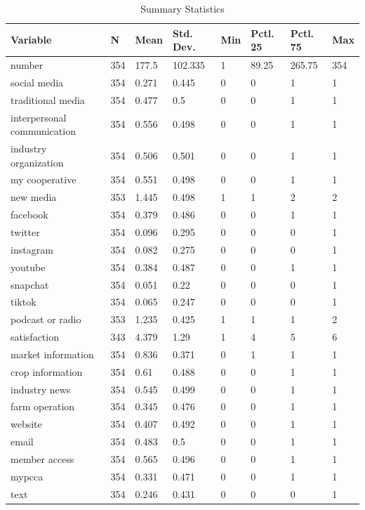 \documentclass[
]{article}
\begin{document}
\begin{table}

\caption{\label{tab:unnamed-chunk-8}Summary Statistics}
\centering
\begin{tabular}[t]{llllllll}
\toprule
Variable & N & Mean & Std. Dev. & Min & Pctl. 25 & Pctl. 75 & Max\\
\midrule
number & 354 & 177.5 & 102.335 & 1 & 89.25 & 265.75 & 354\\
social media & 354 & 0.271 & 0.445 & 0 & 0 & 1 & 1\\
traditional media & 354 & 0.477 & 0.5 & 0 & 0 & 1 & 1\\
interpersonal communication & 354 & 0.556 & 0.498 & 0 & 0 & 1 & 1\\
industry organization & 354 & 0.506 & 0.501 & 0 & 0 & 1 & 1\\
\addlinespace
my cooperative & 354 & 0.551 & 0.498 & 0 & 0 & 1 & 1\\
new media & 353 & 1.445 & 0.498 & 1 & 1 & 2 & 2\\
facebook & 354 & 0.379 & 0.486 & 0 & 0 & 1 & 1\\
twitter & 354 & 0.096 & 0.295 & 0 & 0 & 0 & 1\\
instagram & 354 & 0.082 & 0.275 & 0 & 0 & 0 & 1\\
\addlinespace
youtube & 354 & 0.384 & 0.487 & 0 & 0 & 1 & 1\\
snapchat & 354 & 0.051 & 0.22 & 0 & 0 & 0 & 1\\
tiktok & 354 & 0.065 & 0.247 & 0 & 0 & 0 & 1\\
podcast or radio & 353 & 1.235 & 0.425 & 1 & 1 & 1 & 2\\
satisfaction & 343 & 4.379 & 1.29 & 1 & 4 & 5 & 6\\
\addlinespace
market information & 354 & 0.836 & 0.371 & 0 & 1 & 1 & 1\\
crop information & 354 & 0.61 & 0.488 & 0 & 0 & 1 & 1\\
industry news & 354 & 0.545 & 0.499 & 0 & 0 & 1 & 1\\
farm operation & 354 & 0.345 & 0.476 & 0 & 0 & 1 & 1\\
website & 354 & 0.407 & 0.492 & 0 & 0 & 1 & 1\\
\addlinespace
email & 354 & 0.483 & 0.5 & 0 & 0 & 1 & 1\\
member access & 354 & 0.565 & 0.496 & 0 & 0 & 1 & 1\\
mypcca & 354 & 0.331 & 0.471 & 0 & 0 & 1 & 1\\
text & 354 & 0.246 & 0.431 & 0 & 0 & 0 & 1\\

\end{tabular}
\end{table}
\end{document}
